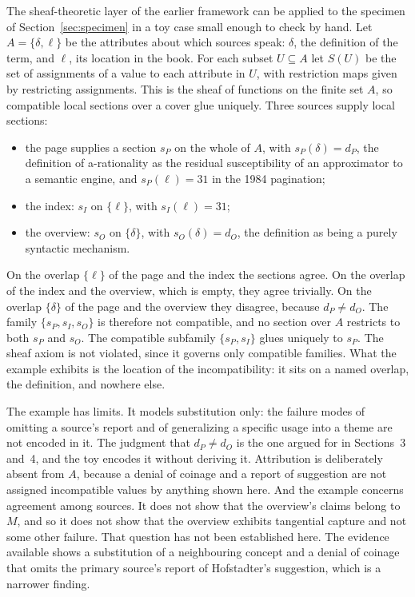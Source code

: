 \documentclass[11pt]{article}
\begin{document}
The sheaf-theoretic layer of the earlier framework can be applied to the specimen of Section~\ref{sec:specimen} in a toy case small enough to check by hand. Let $A=\{\delta,\ell\}$ be the attributes about which sources speak: $\delta$, the definition of the term, and $\ell$, its location in the book. For each subset $U\subseteq A$ let $S(U)$ be the set of assignments of a value to each attribute in $U$, with restriction maps given by restricting assignments. This is the sheaf of functions on the finite set $A$, so compatible local sections over a cover glue uniquely. Three sources supply local sections:
\begin{itemize}
\item the page supplies a section $s_P$ on the whole of $A$, with $s_P(\delta)=d_P$, the definition of a-rationality as the residual susceptibility of an approximator to a semantic engine, and $s_P(\ell)=31$ in the 1984 pagination;
\item the index: $s_I$ on $\{\ell\}$, with $s_I(\ell)=31$;
\item the overview: $s_O$ on $\{\delta\}$, with $s_O(\delta)=d_O$, the definition as being a purely syntactic mechanism.
\end{itemize}
On the overlap $\{\ell\}$ of the page and the index the sections agree. On the overlap of the index and the overview, which is empty, they agree trivially. On the overlap $\{\delta\}$ of the page and the overview they disagree, because $d_P\neq d_O$. The family $\{s_P,s_I,s_O\}$ is therefore not compatible, and no section over $A$ restricts to both $s_P$ and $s_O$. The compatible subfamily $\{s_P,s_I\}$ glues uniquely to $s_P$. The sheaf axiom is not violated, since it governs only compatible families. What the example exhibits is the location of the incompatibility: it sits on a named overlap, the definition, and nowhere else.

The example has limits. It models substitution only: the failure modes of omitting a source's report and of generalizing a specific usage into a theme are not encoded in it. The judgment that $d_P\neq d_O$ is the one argued for in Sections~3 and~4, and the toy encodes it without deriving it. Attribution is deliberately absent from $A$, because a denial of coinage and a report of suggestion are not assigned incompatible values by anything shown here. And the example concerns agreement among sources. It does not show that the overview's claims belong to $M$, and so it does not show that the overview exhibits tangential capture and not some other failure. That question has not been established here. The evidence available shows a substitution of a neighbouring concept and a denial of coinage that omits the primary source's report of Hofstadter's suggestion, which is a narrower finding.
\end{document}
